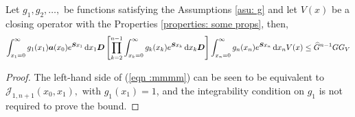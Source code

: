 \begin{cor}\label{cor: ksjkd}
	Let \(g_1, g_2, \dots,\) be functions satisfying the Assumptions \ref{asu: g} and let \(V(x)\) be a closing operator with the Properties \ref{properties: some props}, then,
	\begin{align}
		\int_{x_1=0}^\infty g_1(x_1) \boldsymbol a (x_0) e^{\boldsymbol{S}x_1}\, \mathrm{d} x_1\boldsymbol D 
            	\left[\prod_{k=2}^{n-1}\int_{x_k=0}^\infty g_k(x_k) e^{\boldsymbol{S}x_k} \, \mathrm{d} x_k \boldsymbol D\right] \int_{x_n=0}^\infty g_{n}(x_n) e^{\boldsymbol{S}x_n} \, \mathrm{d} x_n V(x) \leq \widehat{G}^{n-1}GG_V \label{eqn :mmmm}
	\end{align}
\end{cor}
\begin{proof}
	The left-hand side of (\ref{eqn :mmmm}) can be seen to be equivalent to \(\mathcal J_{1,n+1}(x_0,x_1),\) with \(g_1(x_1)=1\), and the integrability condition on \(g_1\) is not required to prove the bound. 
\end{proof}

